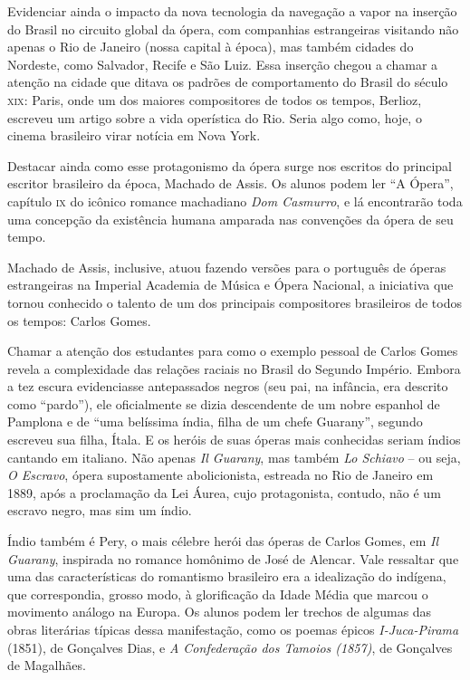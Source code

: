 \documentclass[11pt]{extarticle}
\begin{document}
Evidenciar ainda o impacto da nova tecnologia da navegação a vapor na inserção
do Brasil no circuito global da ópera, com companhias estrangeiras visitando
não apenas o Rio de Janeiro (nossa capital à época), mas também cidades do
Nordeste, como Salvador, Recife e São Luiz. Essa inserção chegou a chamar a
atenção na cidade que ditava os padrões de comportamento do Brasil do século
\textsc{xix}: Paris, onde um dos maiores compositores de todos os tempos, Berlioz,
escreveu um artigo sobre a vida operística do Rio. Seria algo como, hoje, o
cinema brasileiro virar notícia em Nova York.

Destacar ainda como esse protagonismo da ópera surge nos escritos do principal
escritor brasileiro da época, Machado de Assis. Os alunos podem ler ``A Ópera'',
capítulo \textsc{ix} do icônico romance machadiano \emph{Dom Casmurro}, e lá encontrarão toda
uma concepção da existência humana amparada nas convenções da ópera de seu
tempo.

Machado de Assis, inclusive, atuou fazendo versões para o português de óperas
estrangeiras na Imperial Academia de Música e Ópera Nacional, a iniciativa que
tornou conhecido o talento de um dos principais compositores brasileiros de
todos os tempos: Carlos Gomes.

Chamar a atenção dos estudantes para como o exemplo pessoal de Carlos Gomes
revela a complexidade das relações raciais no Brasil do Segundo Império. Embora
a tez escura evidenciasse antepassados negros (seu pai, na infância, era
descrito como “pardo”), ele oficialmente se dizia descendente de um nobre
espanhol de Pamplona e de ``uma belíssima índia, filha de um chefe Guarany'',
segundo escreveu sua filha, Ítala. E os heróis de suas óperas mais conhecidas
seriam índios cantando em italiano. Não apenas \emph{Il Guarany}, mas também \emph{Lo
Schiavo} – ou seja, \emph{O Escravo}, ópera supostamente abolicionista, estreada no Rio
de Janeiro em 1889, após a proclamação da Lei Áurea, cujo protagonista,
contudo, não é um escravo negro, mas sim um índio.

Índio também é Pery, o mais célebre herói das óperas de Carlos Gomes, em \emph{Il Guarany}, inspirada no romance homônimo de José de Alencar. Vale ressaltar que
uma das características do romantismo brasileiro era a idealização do indígena,
que correspondia, grosso modo, à glorificação da Idade Média que marcou o
movimento análogo na Europa. Os alunos podem ler trechos de algumas das obras
literárias  típicas dessa manifestação, como os poemas épicos \emph{I-Juca-Pirama}
(1851), de Gonçalves Dias, e \emph{A Confederação dos Tamoios (1857)}, de Gonçalves de
Magalhães.
\end{document}
